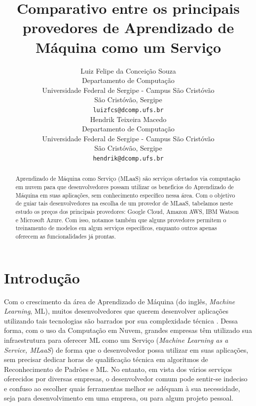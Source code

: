 \documentclass{article}
\title{Comparativo entre os principais provedores de Aprendizado de Máquina como um Serviço}
\author{
  Luiz Felipe da Conceição Souza \\
  Departamento de Computação\\
  Universidade Federal de Sergipe - Campus São Cristóvão\\
  São Cristóvão, Sergipe \\
  \texttt{luizfcs@dcomp.ufs.br} \\
   \And
 Hendrik Teixeira Macedo \\
  Departamento de Computação\\
 Universidade Federal de Sergipe - Campus São Cristóvão\\
  São Cristóvão, Sergipe \\
  \texttt{hendrik@dcomp.ufs.br} \\
}
\begin{document}
\maketitle

\begin{abstract}
Aprendizado de Máquina como Serviço (MLaaS) são serviços ofertados via computação em nuvem para que desenvolvedores possam utilizar os benefícios do Aprendizado de Máquina em suas aplicações, sem conhecimento específico nessa área. Com o objetivo de guiar tais desenvolvedores na escolha de um provedor de MLaaS, tabelamos neste estudo os preços dos principais provedores: Google Cloud, Amazon AWS, IBM Watson e Microsoft Azure. Com isso, notamos também que alguns provedores permitem o treinamento de modelos em algun serviços específicos, enquanto outros apenas oferecem as funcionalidades já prontas.
\end{abstract}


\section{Introdução}
Com o crescimento da área de Aprendizado de Máquina (do inglês, \textit{Machine Learning}, ML)\cite{alpaydin2014introduction}, muitos desenvolvedores que querem desenvolver aplicações utilizando tais tecnologias são barrados por sua complexidade técnica \cite{ribeiro2015}. Dessa forma, com o uso da Computação em Nuvem, grandes empresas têm utilizado sua infraestrutura para oferecer ML como um Serviço (\textit{Machine Learning as a Service, MLaaS}) de forma que o desenvolvedor possa utilizar em suas aplicações, sem precisar dedicar horas de qualificação técnica em algoritmos de Reconhecimento de Padrões e ML. No entanto, em vista dos vários serviços oferecidos por diversas empresas, o desenvolvedor comum pode sentir-se indeciso e confuso ao escolher quais ferramentas melhor se adéquam à sua necessidade, seja para desenvolvimento em uma empresa, ou para algum projeto pessoal.
\end{document}
